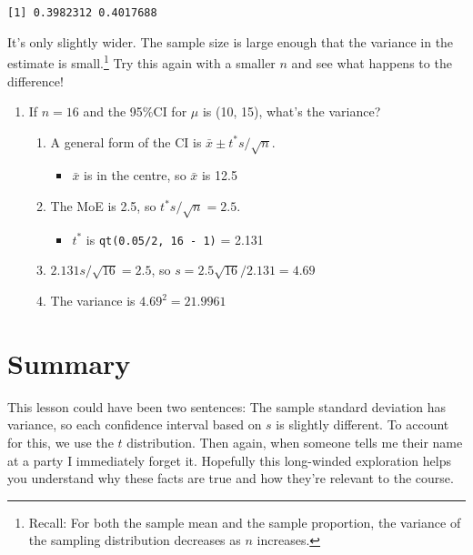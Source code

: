\documentclass[
  letterpaper,
  DIV=11,
  numbers=noendperiod]{scrreprt}
\providecommand{\tightlist}{%
  \setlength{\itemsep}{0pt}\setlength{\parskip}{0pt}}\usepackage{longtable,booktabs,array}
\begin{document}
\begin{verbatim}
[1] 0.3982312 0.4017688
\end{verbatim}

It's only slightly wider. The sample size is large enough that the
variance in the estimate is small.\footnote{Recall: For both the sample
  mean and the sample proportion, the variance of the sampling
  distribution decreases as \(n\) increases.} Try this again with a
smaller \(n\) and see what happens to the difference!

\begin{enumerate}
\def\labelenumi{\arabic{enumi}.}
\setcounter{enumi}{2}
\tightlist
\item
  If \(n=16\) and the 95\%CI for \(\mu\) is (10, 15), what's the
  variance?

  \begin{enumerate}
  \def\labelenumii{\arabic{enumii}.}
  \tightlist
  \item
    A general form of the CI is \(\bar x \pm t^* s/\sqrt{n}\).

    \begin{itemize}
    \tightlist
    \item
      \(\bar x\) is in the centre, so \(\bar x\) is 12.5
    \end{itemize}
  \item
    The MoE is 2.5, so \(t^* s/\sqrt{n} = 2.5\).

    \begin{itemize}
    \tightlist
    \item
      \(t^*\) is \texttt{qt(0.05/2,\ 16\ -\ 1)} = 2.131
    \end{itemize}
  \item
    \(2.131s/\sqrt{16} = 2.5\), so \(s = 2.5\sqrt{16}/2.131 = 4.69\)
  \item
    The variance is \(4.69^2 = 21.9961\)
  \end{enumerate}
\end{enumerate}

\hypertarget{summary-6}{%
\section{Summary}\label{summary-6}}

This lesson could have been two sentences: The sample standard deviation
has variance, so each confidence interval based on \(s\) is slightly
different. To account for this, we use the \(t\) distribution. Then
again, when someone tells me their name at a party I immediately forget
it. Hopefully this long-winded exploration helps you understand why
these facts are true and how they're relevant to the course.
\end{document}

